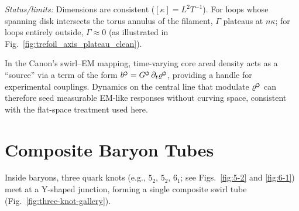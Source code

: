 \documentclass[reprint,aps,onecolumn,nofootinbib]{revtex4-2}
\newcommand{\swirlarrow}{%
    \mathchoice{\mkern-2mu\scriptstyle\boldsymbol{\circlearrowleft}}%
    {\mkern-2mu\scriptstyle\boldsymbol{\circlearrowleft}}%
    {\mkern-2mu\scriptscriptstyle\boldsymbol{\circlearrowleft}}%
    {\mkern-2mu\scriptscriptstyle\boldsymbol{\circlearrowleft}}%
}
\begin{document}
    \noindent\emph{Status/limits:} Dimensions are consistent ($[\kappa]=L^2T^{-1}$). For loops whose spanning disk intersects the torus annulus of the filament, $\Gamma$ plateaus at $n\kappa$; for loops entirely outside, $\Gamma\approx 0$ (as illustrated in Fig.~\ref{fig:trefoil_axis_plateau_clean}).

    \begin{tcolorbox}[title=\textbf{Swirl–EM correspondence (operational note)}]
        In the Canon’s swirl–EM mapping, time-varying core areal density acts as a “source” via a term of the form $b^{\swirlarrow}=G^{\swirlarrow}\,\partial_t \varrho^{\swirlarrow}$, providing a handle for experimental couplings. Dynamics on the central line that modulate $\varrho^{\swirlarrow}$ can therefore seed measurable EM-like responses without curving space, consistent with the flat-space treatment used here.
    \end{tcolorbox}

\section{Composite Baryon Tubes}
    Inside baryons, three quark knots (e.g., $5_2$, $5_2$, $6_1$; see Figs.~\ref{fig:5-2} and \ref{fig:6-1}) meet at a Y-shaped junction, forming a single composite swirl tube (Fig.~\ref{fig:three-knot-gallery}).
\end{document}
